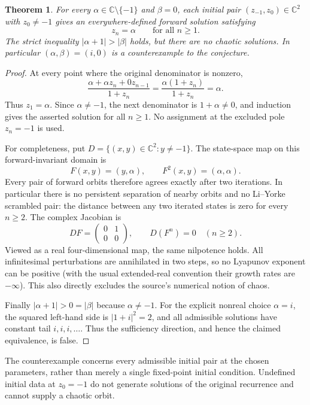 \documentclass[11pt]{article}
\newtheorem{theorem}{Theorem}
\begin{document}
\begin{theorem}
For every $\alpha\in\mathbb C\setminus\{-1\}$ and $\beta=0$, each
initial pair $(z_{-1},z_0)\in\mathbb C^2$ with $z_0\ne-1$ gives an
everywhere-defined forward solution satisfying
\[
 z_n=\alpha\qquad\text{for all }n\ge1.
\]
The strict inequality $|\alpha+1|>|\beta|$ holds, but there are no
chaotic solutions. In particular $(\alpha,\beta)=(i,0)$ is a
counterexample to the conjecture.
\end{theorem}
\begin{proof}
At every point where the original denominator is nonzero,
\[
 \frac{\alpha+\alpha z_n+0z_{n-1}}{1+z_n}
 =\frac{\alpha(1+z_n)}{1+z_n}=\alpha.
\]
Thus $z_1=\alpha$. Since $\alpha\ne-1$, the next denominator is
$1+\alpha\ne0$, and induction gives the asserted solution for all
$n\ge1$. No assignment at the excluded pole $z_n=-1$ is used.

For completeness, put $D=\{(x,y)\in\mathbb C^2:y\ne-1\}$.
The state-space map on this forward-invariant domain is
\[
 F(x,y)=(y,\alpha),\qquad F^2(x,y)=(\alpha,\alpha).
\]
Every pair of forward orbits therefore agrees exactly after two
iterations. In particular there is no persistent separation of nearby
orbits and no Li--Yorke scrambled pair: the distance between any two
iterated states is zero for every $n\ge2$.
The complex Jacobian is
\[
 DF=\begin{pmatrix}0&1\\0&0\end{pmatrix},\qquad
 D(F^n)=0\quad(n\ge2).
\]
Viewed as a real four-dimensional map, the same nilpotence holds.
All infinitesimal perturbations are annihilated in two steps, so no
Lyapunov exponent can be positive (with the usual extended-real
convention their growth rates are $-\infty$). This also directly
excludes the source's numerical notion of chaos.

Finally $|\alpha+1|>0=|\beta|$ because $\alpha\ne-1$.
For the explicit nonreal choice $\alpha=i$, the squared left-hand
side is $|1+i|^2=2$, and all admissible solutions have constant tail
$i,i,i,\ldots$. Thus the sufficiency direction, and hence the
claimed equivalence, is false.
\end{proof}

The counterexample concerns every admissible initial pair at the chosen
parameters, rather than merely a single fixed-point initial condition.
Undefined initial data at $z_0=-1$ do not generate solutions of the
original recurrence and cannot supply a chaotic orbit.
\end{document}
